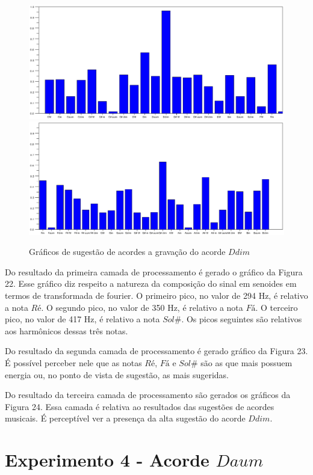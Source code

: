 \begin{figure}[h]
	\centering
		\includegraphics[keepaspectratio=true,scale=0.49]{figuras/Dm/acordes_1_Ddim.eps}
		\includegraphics[keepaspectratio=true,scale=0.49]{figuras/Dm/acordes_2_Ddim.eps}
	\caption{Gráficos de sugestão de acordes a gravação do acorde $Ddim$}
\end{figure}
\newpage

Do resultado da primeira camada de processamento é gerado o gráfico da Figura 22. Esse gráfico diz respeito a natureza da composição do sinal em senoides em termos de transformada de fourier. O primeiro pico, no valor de 294 Hz, é relativo a nota $Ré$. O segundo pico, no valor de 350 Hz, é relativo a nota $Fá$. O terceiro pico, no valor de 417 Hz, é relativo a nota $Sol\#$. Os picos seguintes são relativos aos harmônicos dessas três notas.

Do resultado da segunda camada de processamento é gerado gráfico da Figura 23. É possível perceber nele que as notas $Ré$, $Fá$ e $Sol\#$ são as que mais possuem energia ou, no ponto de vista de sugestão, as mais sugeridas.

Do resultado da terceira camada de processamento são gerados os gráficos da Figura 24. Essa camada é relativa ao resultados das sugestões de acordes musicais. É perceptível ver a presença da alta sugestão do acorde $Ddim$.

\section{Experimento 4 - Acorde $Daum$}
\label{sec:experimento4}


